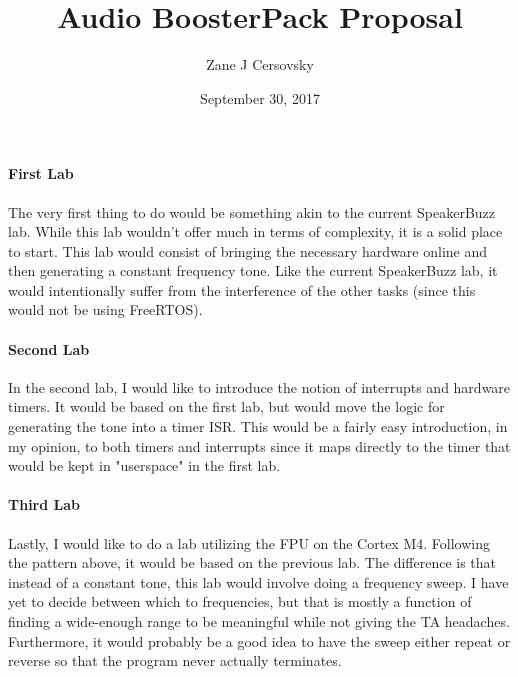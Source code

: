 \documentclass{article}
\title{Audio BoosterPack Proposal}
\author{Zane J Cersovsky}
\date{September 30, 2017}
\begin{document}
    \maketitle
    \paragraph{First Lab}
    The very first thing to do would be something akin to the current SpeakerBuzz lab. While this lab wouldn't offer 
    much in terms of complexity, it is a solid place to start. This lab would consist of bringing the necessary hardware
    online and then generating a constant frequency tone. Like the current SpeakerBuzz lab, it would intentionally suffer 
    from the interference of the other tasks (since this would not be using FreeRTOS).

    \paragraph{Second Lab}
    In the second lab, I would like to introduce the notion of interrupts and hardware timers. It would be based on the 
    first lab, but would move the logic for generating the tone into a timer ISR. This would be a fairly easy introduction,
    in my opinion, to both timers and interrupts since it maps directly to the timer that would be kept in "userspace" in 
    the first lab.

    \paragraph{Third Lab}
    Lastly, I would like to do a lab utilizing the FPU on the Cortex M4. Following the pattern above, it would be based on the 
    previous lab. The difference is that instead of a constant tone, this lab would involve doing a frequency sweep. I have yet 
    to decide between which to frequencies, but that is mostly a function of finding a wide-enough range to be meaningful while 
    not giving the TA headaches. Furthermore, it would probably be a good idea to have the sweep either repeat or reverse so 
    that the program never actually terminates.
\end{document}
